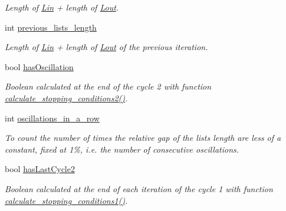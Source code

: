 \begin{DoxyCompactItemize}
\begin{DoxyCompactList}\small\item\em Length of \hyperlink{classofeli_1_1_active_contour_a7662d4f5c8b87d3e642b08b7e341bd79}{Lin} + length of \hyperlink{classofeli_1_1_active_contour_a31e0eb18a7ea6ae90acf66ed018fcd85}{Lout}. \end{DoxyCompactList}\item 
\hypertarget{classofeli_1_1_active_contour_a653c2bcd37ed61e9eacda89a013590d4}{int \hyperlink{classofeli_1_1_active_contour_a653c2bcd37ed61e9eacda89a013590d4}{previous\-\_\-lists\-\_\-length}}\label{classofeli_1_1_active_contour_a653c2bcd37ed61e9eacda89a013590d4}

\begin{DoxyCompactList}\small\item\em Length of \hyperlink{classofeli_1_1_active_contour_a7662d4f5c8b87d3e642b08b7e341bd79}{Lin} + length of \hyperlink{classofeli_1_1_active_contour_a31e0eb18a7ea6ae90acf66ed018fcd85}{Lout} of the previous iteration. \end{DoxyCompactList}\item 
\hypertarget{classofeli_1_1_active_contour_a23e817e4d98cdc2ba8da0b44c5d0ffb8}{bool \hyperlink{classofeli_1_1_active_contour_a23e817e4d98cdc2ba8da0b44c5d0ffb8}{has\-Oscillation}}\label{classofeli_1_1_active_contour_a23e817e4d98cdc2ba8da0b44c5d0ffb8}

\begin{DoxyCompactList}\small\item\em Boolean calculated at the end of the cycle 2 with function {\itshape \hyperlink{classofeli_1_1_active_contour_a218109b08dd520c95ee7613235bb0593}{calculate\-\_\-stopping\-\_\-conditions2()}}. \end{DoxyCompactList}\item 
\hypertarget{classofeli_1_1_active_contour_a01b0cfb6e5593b267bceb72e288cfe88}{int \hyperlink{classofeli_1_1_active_contour_a01b0cfb6e5593b267bceb72e288cfe88}{oscillations\-\_\-in\-\_\-a\-\_\-row}}\label{classofeli_1_1_active_contour_a01b0cfb6e5593b267bceb72e288cfe88}

\begin{DoxyCompactList}\small\item\em To count the number of times the relative gap of the lists length are less of a constant, fixed at 1\%, i.\-e. the number of consecutive oscillations. \end{DoxyCompactList}\item 
\hypertarget{classofeli_1_1_active_contour_a0da1bffb7f554ec0b87daa7a0f274d7e}{bool \hyperlink{classofeli_1_1_active_contour_a0da1bffb7f554ec0b87daa7a0f274d7e}{has\-Last\-Cycle2}}\label{classofeli_1_1_active_contour_a0da1bffb7f554ec0b87daa7a0f274d7e}

\begin{DoxyCompactList}\small\item\em Boolean calculated at the end of each iteration of the cycle 1 with function {\itshape \hyperlink{classofeli_1_1_active_contour_a7c7275006d98705cd7f04f8a7fe7e697}{calculate\-\_\-stopping\-\_\-conditions1()}}. \end{DoxyCompactList}\end{DoxyCompactItemize}
